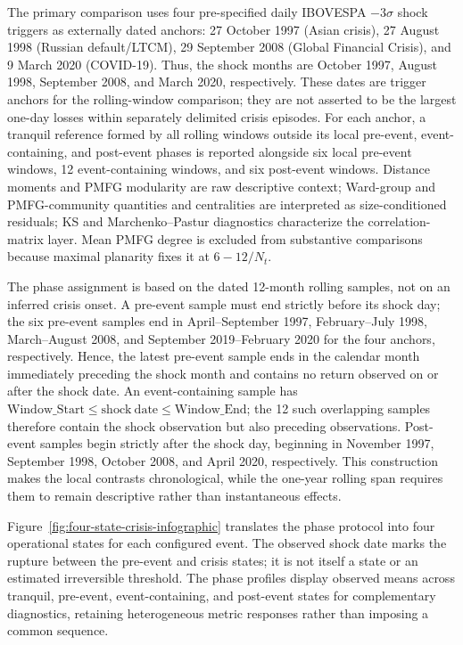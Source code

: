 \documentclass[a4paper,fleqn,review]{cas-sc}
\begin{document}
The primary comparison uses four pre-specified daily IBOVESPA $-3\sigma$ shock triggers as externally dated anchors: 27 October 1997 (Asian crisis), 27 August 1998 (Russian default/LTCM), 29 September 2008 (Global Financial Crisis), and 9 March 2020 (COVID-19). Thus, the shock months are October 1997, August 1998, September 2008, and March 2020, respectively. These dates are trigger anchors for the rolling-window comparison; they are not asserted to be the largest one-day losses within separately delimited crisis episodes. For each anchor, a tranquil reference formed by all rolling windows outside its local pre-event, event-containing, and post-event phases is reported alongside six local pre-event windows, 12 event-containing windows, and six post-event windows. Distance moments and PMFG modularity are raw descriptive context; Ward-group and PMFG-community quantities and centralities are interpreted as size-conditioned residuals; KS and Marchenko--Pastur diagnostics characterize the correlation-matrix layer. Mean PMFG degree is excluded from substantive comparisons because maximal planarity fixes it at $6-12/N_t$.

The phase assignment is based on the dated 12-month rolling samples, not on an inferred crisis onset. A pre-event sample must end strictly before its shock day; the six pre-event samples end in April--September 1997, February--July 1998, March--August 2008, and September 2019--February 2020 for the four anchors, respectively. Hence, the latest pre-event sample ends in the calendar month immediately preceding the shock month and contains no return observed on or after the shock date. An event-containing sample has $\mathrm{Window\_Start}\leq\mathrm{shock\ date}\leq\mathrm{Window\_End}$; the 12 such overlapping samples therefore contain the shock observation but also preceding observations. Post-event samples begin strictly after the shock day, beginning in November 1997, September 1998, October 2008, and April 2020, respectively. This construction makes the local contrasts chronological, while the one-year rolling span requires them to remain descriptive rather than instantaneous effects.

Figure~\ref{fig:four-state-crisis-infographic} translates the phase protocol into four operational states for each configured event. The observed shock date marks the rupture between the pre-event and crisis states; it is not itself a state or an estimated irreversible threshold. The phase profiles display observed means across tranquil, pre-event, event-containing, and post-event states for complementary diagnostics, retaining heterogeneous metric responses rather than imposing a common sequence.
\end{document}
